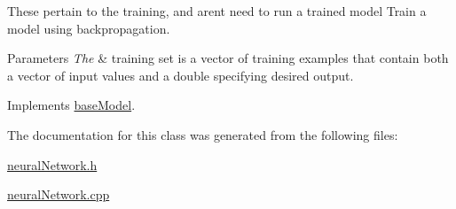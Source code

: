 These pertain to the training, and aren\textquotesingle{}t need to run a trained model Train a model using backpropagation.


\begin{DoxyParams}{Parameters}
{\em The} & training set is a vector of training examples that contain both a vector of input values and a double specifying desired output. \\
\hline
\end{DoxyParams}


Implements \hyperlink{classbase_model_ab6cbd549d6742029ab9768bc88467b4f}{base\+Model}.



The documentation for this class was generated from the following files\+:\begin{DoxyCompactItemize}
\item 
\hyperlink{neural_network_8h}{neural\+Network.\+h}\item 
\hyperlink{neural_network_8cpp}{neural\+Network.\+cpp}\end{DoxyCompactItemize}
